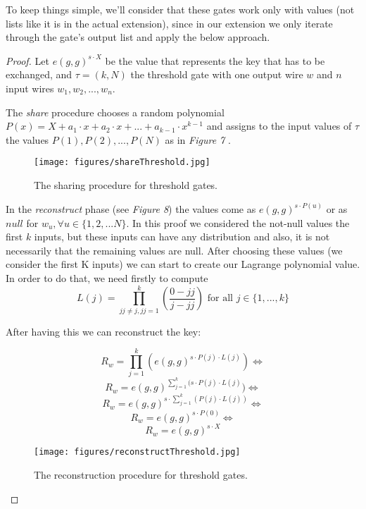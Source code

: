 \documentclass[12pt]{article}
\begin{document}
To keep things simple, we'll consider that these gates work only with values (not lists like it is in the actual extension), since in our extension we only iterate through the gate's output list and apply the below approach.

\begin{proof}

Let $e(g, g)^{s \cdot X}$ be the value that represents the key that has to be exchanged, and $\tau = (k, N)$ the threshold gate with one output wire $w$ and $n$ input wires $w_1, w_2, ...,w_n$.

The \textit{share} procedure chooses a random polynomial $P(x) = X + a_1 \cdot x + a_2 \cdot x + ... + a_{k - 1} \cdot x^{k - 1}$ and assigns to the input values of $\tau$ the values $P(1), P(2), ..., P(N)$ as in \textit{Figure 7 }.

\begin{center}
  \begin{figure}[htpb]
\centering
\texttt{[image: figures/shareThreshold.jpg]}
\caption{
    The sharing procedure for threshold gates.
}
\end{figure}
\end{center}

In the \textit{reconstruct} phase (see \textit{Figure 8}) the values come as $e(g, g) ^ {s \cdot P(u)}$ or as $null$ for $w_u, \forall u \in \{1, 2, ... N\}$. In this proof we considered the not-null values the first $k$ inputs, but these inputs can have any distribution and also, it is not necessarily that the remaining values are null. After choosing these values (we consider the first K inputs) we can start to create our Lagrange polynomial value. In order to do that, we need firstly to compute $$L(j) = \prod_{jj \neq j, jj = 1}^{k}(\frac{0 - jj}{j - jj}) \textrm{ for all } j \in \{1, ..., k\}$$

After having this we can reconstruct the key:

$$R_w = \prod_{j = 1}^{k} (e(g, g) ^{s \cdot P (j) \cdot L(j)}) \Leftrightarrow$$
$$R_w = e(g, g) ^{\sum_{j = 1}^{k} (s \cdot P (j) \cdot L(j)}) \Leftrightarrow$$
$$R_w = e(g, g) ^{s \cdot \sum_{j = 1}^{k} (P (j) \cdot L(j))} \Leftrightarrow$$
$$R_w = e(g, g) ^{s \cdot P(0)} \Leftrightarrow$$
$$R_w = e(g, g) ^{s \cdot X}$$


\begin{center}
  \begin{figure}[htpb]
\centering
\texttt{[image: figures/reconstructThreshold.jpg]}
\caption{
    The reconstruction procedure for threshold gates.
}
\end{figure}
\end{center}


\end{proof}
\end{document}
